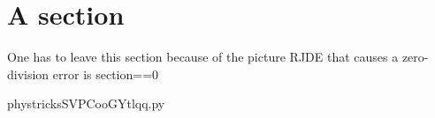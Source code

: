 

\section{A section}

One has to leave this section because of the picture RJDE that causes a zero-division error is section==0 



    \newcommand{\CaptionFigSVPCooGYtlqq}{This is an automatically generated default caption; do not change.}
    \begin{center}
        
    \end{center}
    phystricksSVPCooGYtlqq.py

    

